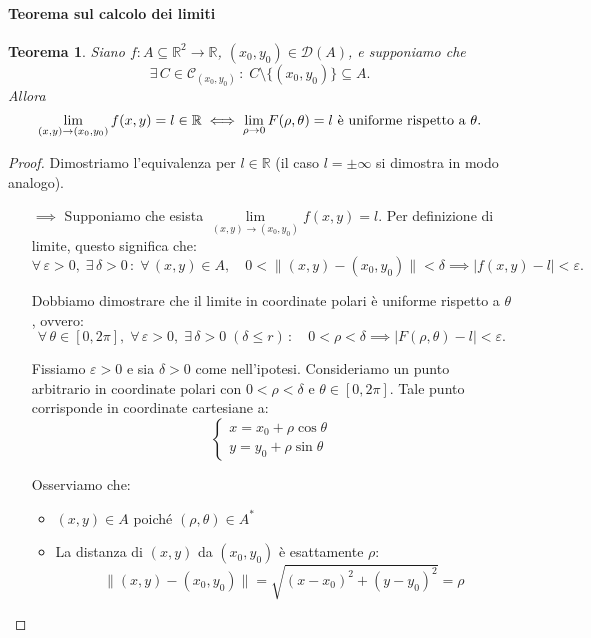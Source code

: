 \documentclass{article}
\theoremstyle{plain}
\newtheorem{thm}{Teorema}[section]
\theoremstyle{definition}
\theoremstyle{remark}
\begin{document}
\paragraph{Teorema sul calcolo dei limiti}
\begin{bxthm}
\begin{thm}
    Siano $f:A\subseteq\mathbb{R}^2\to\mathbb{R}$, $(x_0,y_0)\in\mathcal{D}(A)$, e supponiamo che
    \[\exists\,C\in\mathcal{C}_{(x_0,y_0)}\,:\;C\setminus\{(x_0,y_0)\}\subseteq A.\]
    Allora \[\lim_{(x,y)\to(x_0,y_0)}f(x,y)=l\in\mathbb{R}\iff \lim_{\rho\to0}F(\rho,\theta)=l\textup{ è uniforme rispetto a }\theta.\]
\end{thm}
\end{bxthm}
\begin{proof}
    Dimostriamo l'equivalenza per $l\in\mathbb{R}$ (il caso $l=\pm\infty$ si dimostra in modo analogo).

    \begin{itemize}
        \item[$\implies$] Supponiamo che esista $\lim\limits_{(x,y)\to(x_0,y_0)}f(x,y)=l$. Per definizione di limite, questo significa che:
        \[\forall\,\varepsilon>0,\;\exists\,\delta>0\,:\;\forall\,(x,y)\in A,\quad 0<\|(x,y)-(x_0,y_0)\|<\delta\implies|f(x,y)-l|<\varepsilon.\]
        
        Dobbiamo dimostrare che il limite in coordinate polari è uniforme rispetto a $\theta$, ovvero:
        \[\forall\,\theta\in[0,2\pi],\;\forall\,\varepsilon>0,\; \exists\,\delta>0\;(\delta\leq r)\,:\quad 0<\rho<\delta\implies |F(\rho,\theta)-l|<\varepsilon.\]
        
        Fissiamo $\varepsilon>0$ e sia $\delta>0$ come nell'ipotesi. Consideriamo un punto arbitrario in coordinate polari con $0<\rho<\delta$ e $\theta\in[0,2\pi]$.
        Tale punto corrisponde in coordinate cartesiane a:
        \[\begin{cases}
            x=x_0+\rho\cos\theta\\
            y=y_0+\rho\sin\theta    
        \end{cases}\]
        
        Osserviamo che:
        \begin{itemize}
            \item $(x,y)\in A$ poiché $(\rho,\theta)\in A^*$ 
            \item La distanza di $(x,y)$ da $(x_0,y_0)$ è esattamente $\rho$:
            \[\|(x,y)-(x_0,y_0)\|=\sqrt{(x-x_0)^2+(y-y_0)^2}=\rho\]
        \end{itemize}
        

\end{itemize}
\end{proof}
\end{document}

